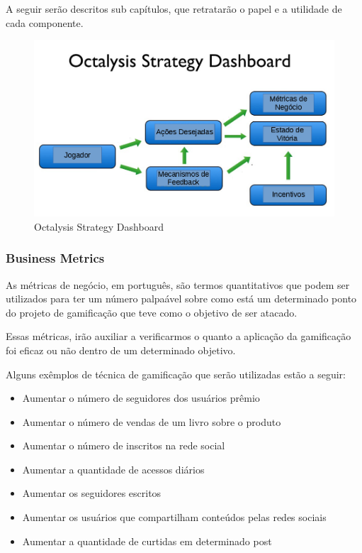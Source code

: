 A seguir serão descritos sub capítulos, que retratarão o papel e a utilidade de
cada
componente.


 \begin{figure}[h]
     \centering

     \includegraphics[width=450px, scale=1]{figuras/dashboard}
     \caption{Octalysis Strategy Dashboard}

     \label{fig:dashboard}
 \end{figure}

\subsubsection{Business Metrics}
\label{sub:business_metrics}
As métricas de negócio, em português, são termos quantitativos que podem ser utilizados
para ter um número palpaável sobre como está um determinado ponto do projeto de gamificação
que teve como o objetivo de ser atacado.

Essas métricas, irão auxiliar a verificarmos o quanto a aplicação da gamificação
 foi eficaz ou
não dentro de um determinado objetivo.

Alguns exêmplos de técnica de gamificação que serão utilizadas estão a seguir:

\begin{itemize}
    \item Aumentar o número de seguidores dos usuários prêmio
    \item Aumentar o número de vendas de um livro sobre o produto
    \item Aumentar o número de inscritos na rede social
    \item Aumentar a quantidade de acessos diários
    \item Aumentar os seguidores escritos
    \item Aumentar os usuários que compartilham conteúdos pelas redes sociais
    \item Aumentar a quantidade de curtidas em determinado post
\end{itemize}

